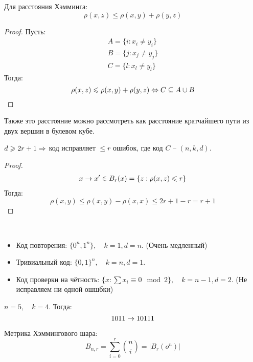 \begin{lemma}
  Для расстояния Хэмминга:
  \[\rho(x,z) \leq \rho(x, y) + \rho(y, z)\]
\end{lemma}

\begin{proof}
  Пусть: 
  \begin{gather}
    A = \{i: x_i \neq y_i\} \\
    B = \{j: x_j \neq y_j\} \\
    C = \{l: x_l \neq y_l\}
  \end{gather}
  Тогда:
  \[\rho(x,z) \leqslant \rho(x, y) + \rho(y, z) \Leftrightarrow C \subseteq A \cup B\]
\end{proof}

\begin{note}
  Также это расстояние можно рассмотреть как расстояние кратчайшего пути из двух вершин в булевом кубе. 
\end{note}

\begin{proposition}
  $d \geqslant 2 r + 1 \Rightarrow $ код исправляет $\leq r$ ошибок, где код $C$ -- $(n, k, d)$.
\end{proposition}

\begin{proof}
  \begin{gather}
    x \rightarrow x' \in B_r(x) = \{z: \rho(x, z) \leqslant r \}
  \end{gather}
  Тогда:
  \[\rho(x, y) \leq \rho(x, y) - \rho(x, x) \leq 2r + 1 - r = r + 1\]
\end{proof}

\begin{example}~
  \begin{itemize}
    \item Код повторения: $\{0^n, 1^n\}, \quad k = 1, d = n$. (Очень медленный)
    \item Тривиальный код: $\{0, 1\}^n, \quad k = n, d = 1$.
    \item Код проверки на чётность: $\{x: \sum x_i \equiv 0 \mod 2\}, \quad k = n - 1, d = 2$. (Не исправляем ни одной ошшбки)
  \end{itemize}
\end{example}

\begin{example}[?]
  $n = 5, \quad k = 4$. Тогда: 
  \[1011 \rightarrow 10111\]
\end{example}

\begin{definition}
  Метрика Хэммингового шара:
  \[B_{n, r} = \sum_{i = 0}^{r} \binom{n}{i} = |B_r(o^n)|\]
\end{definition}

